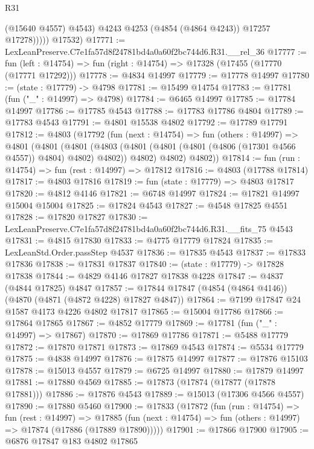 \begin{lexlean}{R31}
\begin{coremodule}
                  (@15640 @4557)
                  @4543)
                @4243
                @4253
                (@4854 (@4864 @4243))
                @17257
                @17278)))))
      @17532)
@17771 := LexLeanPreserve.C7e1fa57d8f24781bd4a0a60f2bc744d6.R31.__rel_36
@17777 := fun (left : @14754) => fun (right : @14754) => @17328 (@17455 (@17770 (@17771 @17292)))
@17778 := @4834 @14997
@17779 := @17778 @14997
@17780 := (state : @17779) -> @4798
@17781 := @15499 @14754
@17783 := @17781 (fun ("_" : @14997) => @4798)
@17784 := @6465 @14997
@17785 := @17784 @14997
@17786 := @17785 @4543
@17788 := @17783 @17786 @4804
@17789 := @17783 @4543
@17791 := @4801 @15538 @4802
@17792 := @17789 @17791
@17812 := @4803
    (@17792
      (fun (next : @14754) =>
      fun (others : @14997) =>
      @4801
        (@4801
          (@4801
            (@4803 (@4801 (@4801 (@4801 (@4806 (@17301 @4566 @4557)) @4804) @4802) @4802))
            @4802)
          @4802)
        @4802))
@17814 := fun (run : @14754) => fun (rest : @14997) => @17812
@17816 := @4803 (@17788 @17814)
@17817 := @4803 @17816
@17819 := fun (state : @17779) => @4803 @17817
@17820 := @4812 @4146
@17821 := @6748 @14997
@17824 := @17821 @14997 @15004 @15004
@17825 := @17824 @4543
@17827 := @4548 @17825 @4551
@17828 := @17820 @17827
@17830 := LexLeanPreserve.C7e1fa57d8f24781bd4a0a60f2bc744d6.R31.__fits_75 @4543
@17831 := @4815 @17830
@17833 := @4775 @17779 @17824
@17835 := LexLeanStd.Order.passStep @4537
@17836 := @17835 @4543
@17837 := @17833 @17836
@17838 := @17831 @17837
@17840 := (state : @17779) -> @17828 @17838
@17844 := @4829 @4146 @17827 @17838 @4228
@17847 := @4837 (@4844 @17825) @4847
@17857 := @17844 @17847 (@4854 (@4864 @4146)) (@4870 (@4871 (@4872 @4228) @17827 @4847))
@17864 := @7199 @17847 @24 @1587 @4173 @4226 @4802 @17817
@17865 := @15004 @17786
@17866 := @17864 @17865
@17867 := @4852 @17779
@17869 := @17781 (fun ("_" : @14997) => @17867)
@17870 := @17869 @17786
@17871 := @5488 @17779
@17872 := @17870 @17871
@17873 := @17869 @4543
@17874 := @5534 @17779
@17875 := @4838 @14997
@17876 := @17875 @14997
@17877 := @17876 @15103
@17878 := @15013 @4557
@17879 := @6725 @14997
@17880 := @17879 @14997
@17881 := @17880 @4569
@17885 := @17873 (@17874 (@17877 (@17878 @17881)))
@17886 := @17876 @4543
@17889 := @15013 (@17306 @4566 @4557)
@17890 := @17880 @5460
@17900 := @17833
    (@17872
      (fun (run : @14754) =>
      fun (rest : @14997) =>
      @17885 (fun (next : @14754) => fun (others : @14997) => @17874 (@17886 (@17889 @17890)))))
@17901 := @17866 @17900
@17905 := @6876 @17847 @183 @4802 @17865

\end{coremodule}
\end{lexlean}
